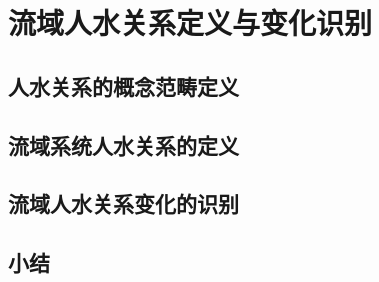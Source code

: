 \chapter{流域人\textendash{}水关系定义与变化识别}\label{ch2:preface}


\section{人\textendash{}水关系的概念范畴定义}\label{ch2:scope}


\section{流域系统人\textendash{}水关系的定义}\label{ch2:definitions}


\section{流域人\textendash{}水关系变化的识别}\label{ch2:dynamic}


\section{小结}\label{ch2:summary}

